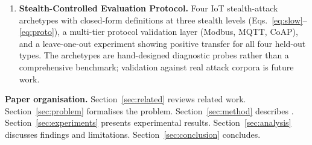 \begin{enumerate}
  \item \textbf{Stealth-Controlled Evaluation Protocol.}
    Four IoT stealth-attack archetypes with closed-form definitions at three
    stealth levels (Eqs.~\ref{eq:slow}--\ref{eq:proto}), a multi-tier protocol
    validation layer (Modbus, MQTT, CoAP), and a leave-one-out experiment
    showing positive transfer for all four held-out types.
    The archetypes are hand-designed diagnostic probes rather than a comprehensive
    benchmark; validation against real attack corpora is future work.
\end{enumerate}

\textbf{Paper organisation.}
Section~\ref{sec:related} reviews related work.
Section~\ref{sec:problem} formalises the problem.
Section~\ref{sec:method} describes \ours{}.
Section~\ref{sec:experiments} presents experimental results.
Section~\ref{sec:analysis} discusses findings and limitations.
Section~\ref{sec:conclusion} concludes.
